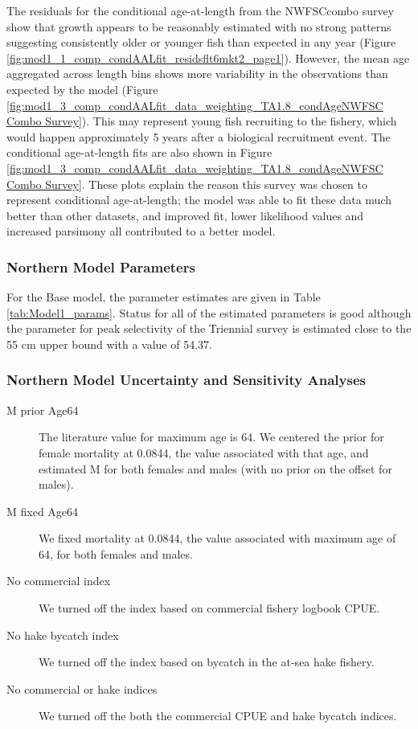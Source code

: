 \documentclass[12pt,]{article}
\begin{document}
The residuals for the conditional age-at-length from the NWFSCcombo
survey show that growth appears to be reasonably estimated with no
strong patterns suggesting consistently older or younger fish than
expected in any year (Figure
\ref{fig:mod1_1_comp_condAALfit_residsflt6mkt2_page1}). However, the
mean age aggregated across length bins shows more variability in the
observations than expected by the model (Figure
\ref{fig:mod1_3_comp_condAALfit_data_weighting_TA1.8_condAgeNWFSC Combo Survey}).
This may represent young fish recruiting to the fishery, which would
happen approximately 5 years after a biological recruitment event. The
conditional age-at-length fits are also shown in Figure
\ref{fig:mod1_3_comp_condAALfit_data_weighting_TA1.8_condAgeNWFSC Combo Survey}.
These plots explain the reason this survey was chosen to represent
conditional age-at-length; the model was able to fit these data much
better than other datasets, and improved fit, lower likelihood values
and increased parsimony all contributed to a better model.

\subsubsection{Northern Model
Parameters}\label{northern-model-parameters}

For the Base model, the parameter estimates are given in Table
\ref{tab:Model1_params}. Status for all of the estimated parameters is
good although the parameter for peak selectivity of the Triennial survey
is estimated close to the 55 cm upper bound with a value of 54.37.

\subsubsection{Northern Model Uncertainty and Sensitivity
Analyses}\label{northern-model-uncertainty-and-sensitivity-analyses}

\begin{description}
\item[M prior Age64] The literature value for maximum age is 64.  We centered the prior for female mortality at 0.0844, the value associated with that age, and estimated M for both females and males (with no prior on the offset for males).
\item[M fixed Age64] We fixed mortality at 0.0844, the value associated with maximum age of 64, for both females and males.
\item[No commercial index] We turned off the index based on commercial fishery logbook CPUE.
\item[No hake bycatch index] We turned off the index based on bycatch in the at-sea hake fishery.
\item[No commercial or hake indices] We turned off the both the commercial CPUE and hake bycatch indices.
\end{description}
\end{document}
